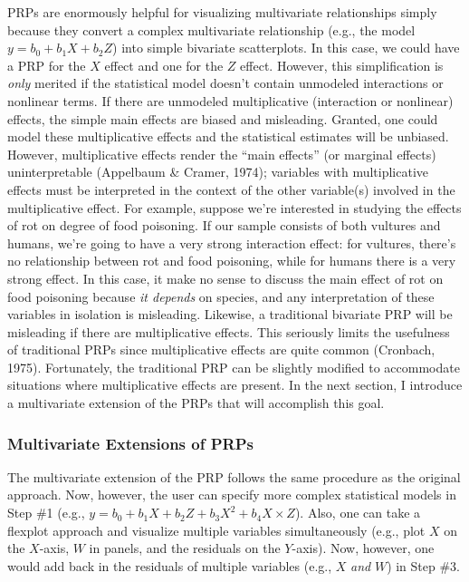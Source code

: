 \documentclass[
  man,floatsintext]{apa6}
\begin{document}
PRPs are enormously helpful for visualizing multivariate relationships simply because they convert a complex multivariate relationship (e.g., the model \(y = b_0 + b_1 X + b_2 Z\)) into simple bivariate scatterplots. In this case, we could have a PRP for the \(X\) effect and one for the \(Z\) effect. However, this simplification is \emph{only} merited if the statistical model doesn't contain unmodeled interactions or nonlinear terms. If there are unmodeled multiplicative (interaction or nonlinear) effects, the simple main effects are biased and misleading. Granted, one could model these multiplicative effects and the statistical estimates will be unbiased. However, multiplicative effects render the ``main effects'' (or marginal effects) uninterpretable (Appelbaum \& Cramer, 1974); variables with multiplicative effects must be interpreted in the context of the other variable(s) involved in the multiplicative effect. For example, suppose we're interested in studying the effects of rot on degree of food poisoning. If our sample consists of both vultures and humans, we're going to have a very strong interaction effect: for vultures, there's no relationship between rot and food poisoning, while for humans there is a very strong effect. In this case, it make no sense to discuss the main effect of rot on food poisoning because \emph{it depends} on species, and any interpretation of these variables in isolation is misleading. Likewise, a traditional bivariate PRP will be misleading if there are multiplicative effects. This seriously limits the usefulness of traditional PRPs since multiplicative effects are quite common (Cronbach, 1975). Fortunately, the traditional PRP can be slightly modified to accommodate situations where multiplicative effects are present. In the next section, I introduce a multivariate extension of the PRPs that will accomplish this goal.

\subsubsection{Multivariate Extensions of PRPs}\label{multivariate-extensions-of-prps}

The multivariate extension of the PRP follows the same procedure as the original approach. Now, however, the user can specify more complex statistical models in Step \#1 (e.g., \(y = b_0 + b_1 X + b_2 Z +b_3 X^2 + b_4 X\times Z\)). Also, one can take a flexplot approach and visualize multiple variables simultaneously (e.g., plot \(X\) on the \(X\)-axis, \(W\) in panels, and the residuals on the \(Y\)-axis). Now, however, one would add back in the residuals of multiple variables (e.g., \(X\) \emph{and} \(W\)) in Step \#3.
\end{document}
